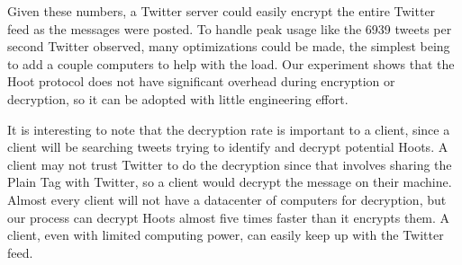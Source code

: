 Given these numbers, a Twitter server could easily encrypt the entire Twitter feed as the messages were posted. To handle peak usage like the 6939 tweets per second Twitter observed, many optimizations could be made, the simplest being to add a couple computers to help with the load. Our experiment shows that the Hoot protocol does not have significant overhead during encryption or decryption, so it can be adopted with little engineering effort.

It is interesting to note that the decryption rate is important to a client, since a client will be searching tweets trying to identify and decrypt potential Hoots. A client may not trust Twitter to do the decryption since that involves sharing the Plain Tag with Twitter, so a client would decrypt the message on their machine. Almost every client will not have a datacenter of computers for decryption, but our  process can decrypt Hoots almost five times faster than it encrypts them. A client, even with limited computing power, can easily keep up with the Twitter feed.